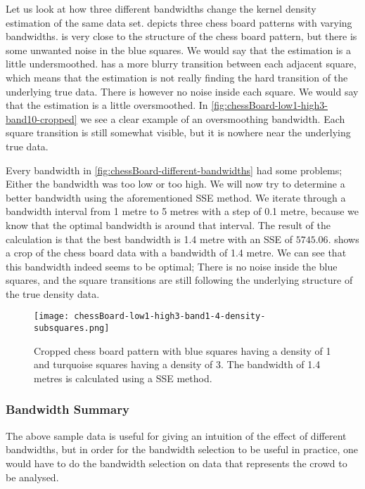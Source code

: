 Let us look at how three different bandwidths change the kernel density estimation of the same data set.  depicts three chess board patterns with varying bandwidths.  is very close to the structure of the chess board pattern, but there is some unwanted noise in the blue squares. We would say that the estimation is a little undersmoothed.  has a more blurry transition between each adjacent square, which means that the estimation is not really finding the hard transition of the underlying true data. There is however no noise inside each square. We would say that the estimation is a little oversmoothed. In \cref{fig:chessBoard-low1-high3-band10-cropped} we see a clear example of an oversmoothing bandwidth. Each square transition is still somewhat visible, but it is nowhere near the underlying true data.

Every bandwidth in \cref{fig:chessBoard-different-bandwidths} had some problems; Either the bandwidth was too low or too high. We will now try to determine a better bandwidth using the aforementioned SSE method. We iterate through a bandwidth interval from 1 metre to 5 metres with a step of 0.1 metre, because we know that the optimal bandwidth is around that interval. The result of the calculation is that the best bandwidth is 1.4 metre with an SSE of $5745.06$.  shows a crop of the chess board data with a bandwidth of 1.4 metre. We can see that this bandwidth indeed seems to be optimal; There is no noise inside the blue squares, and the square transitions are still following the underlying structure of the true density data.

\begin{figure}[htbp]
\centering
\texttt{[image: chessBoard-low1-high3-band1-4-density-subsquares.png]}
\caption[Analysed chess board pattern with bandwidth 1.4]{Cropped chess board pattern with blue squares having a density of 1 and turquoise squares having a density of 3. The bandwidth of 1.4 metres is calculated using a SSE method.}
\label{fig:chessBoard-low1-high3-band1.4-cropped}
\end{figure}

\subsubsection{Bandwidth Summary}

The above sample data is useful for giving an intuition of the effect of different bandwidths, but in order for the bandwidth selection to be useful in practice, one would have to do the bandwidth selection on data that represents the crowd to be analysed.